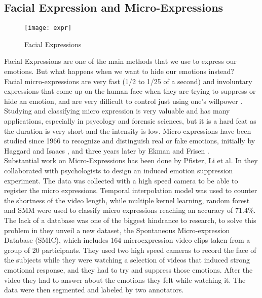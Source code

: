 \subsection*{Facial Expression and Micro-Expressions}

\begin{figure}[!]
	\centering
	\texttt{[image: expr]}
	\caption{Facial Expressions}
\end{figure}

Facial Expressions are one of the main methods that we use to express our emotions. But what happens when we want to hide our emotions instead? \\
Facial micro-expressions are very fast (1/2 to 1/25 of a second) and involuntary expressions that come up on the human face when they are trying to suppress or hide an emotion, and are very difficult to control just using one's willpower \cite{EkmanER}. 
Studying and classifying micro expression is very valuable and has many applications, especially in psycology and forensic sciences, but it is a hard feat as the duration is very short and the intensity is low. 
Micro-expressions have been studied since 1966 to recognize and distinguish real or fake emotions, initially by Haggard and Isaacs \cite{Haggard}, and three years later by Ekman and Frisen \cite{EkmanLeakage}. \\
Substantial work on Micro-Expressions has been done by Pfister, Li et al. In \cite{pfister2011micro} they collaborated with psychologists to design an induced emotion suppression experiment. The data was collected with a high speed camera to be able to register the micro expressions. Temporal interpolation model was used to counter the shortness of the video length, while multiple kernel learning, random forest and SMM were used to classify micro expressions reaching an accuracy of 71.4\%. \\
The lack of a database was one of the biggest hindrance to research, to solve this problem in  \cite{xli2012spontaneous} they unveil a new dataset, the Spontaneous Micro-expression Database (SMIC), which includes 164 microexpression video clips taken from a group of 20 participants. They used two high speed cameras to record the face of the subjects while they were watching a selection of videos that induced strong emotional response, and they had to try and suppress those emotions. After the video they had to answer about the emotions they felt while watching it. The data were then segmented and labeled by two annotators. \\
